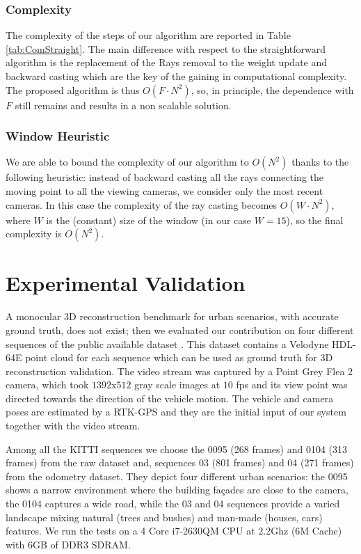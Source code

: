 \subsubsection{Complexity}
The complexity of the steps of our algorithm are reported in Table \ref{tab:ComStraight}. The main difference with respect to the straightforward algorithm is the replacement of the Rays removal to the weight update and backward casting which are the key of the gaining in computational complexity.
The proposed algorithm is thus $O(F\cdot N^2)$, so, in principle, the dependence with $F$ still remains and results in a non scalable solution. 

\subsubsection{Window Heuristic}
\label{subsub:window}
We are able to bound the complexity of our algorithm to $O(N^2)$ thanks to the following heuristic: instead of backward casting all the rays connecting the moving point to all the viewing cameras, we consider only the most recent cameras.
In this case the complexity of the ray casting becomes  $O(W\cdot N^2)$, where $W$ is the (constant) size  of the window (in our case $W = 15$), so the final complexity is $O(N^2)$.



\section{Experimental Validation}

A monocular 3D reconstruction benchmark for urban scenarios, with accurate ground truth, does not exist; then we evaluated our contribution on four different sequences of the public available dataset \cite{Geiger_et_al12}. 
This dataset contains a Velodyne HDL-64E point cloud for each sequence which can be used as ground truth for 3D reconstruction validation.
The video stream was captured by a Point Grey Flea 2 camera, which took $1392\text{x}512$ gray scale images at $10$ fps and its view point was directed towards the direction of the vehicle motion. 
The vehicle and camera poses are estimated by a RTK-GPS and they are the initial input of our system together with the video stream.

Among all the KITTI sequences we choose the 0095 (268 frames) and 0104 (313 frames) from the raw dataset and, sequences 03 (801 frames) and 04 (271 frames) from the odometry dataset. 
They depict four different urban scenarios: the 0095 shows a narrow environment where the building fa\c{c}ades are close to the camera, the 0104 captures a wide road, while the 03 and 04 sequences provide a varied landscape mixing natural (trees and bushes) and man-made (houses, cars) features.
We run the tests on a 4 Core i7-2630QM CPU at 2.2Ghz (6M Cache) with 6GB of DDR3 SDRAM.

